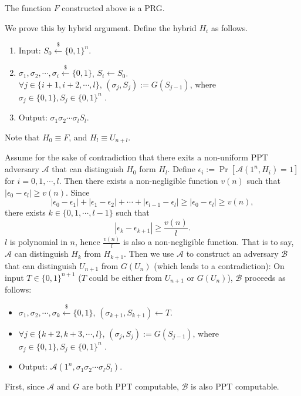 \documentclass[12pt]{tufte-book}
\newcommand{\ma}{\mathcal{A}}
\begin{document}
\begin{theorem}
The function $F$ constructed above is a PRG.
\end{theorem}

\proof
We prove this by hybrid argument. Define the hybrid $H_i$ as follows.
\begin{enumerate}[label=(\alph*)]
	\item Input: $S_0 \xleftarrow{\$} \{0, 1\}^n$.
    \item $\sigma_1, \sigma_2, \cdots, \sigma_i \xleftarrow{\$} \{0, 1\}$, $S_i \gets S_0$.\\
     $\forall j \in \{i+1, i+2, \cdots, l\}$, $(\sigma_j, S_j) := G(S_{j-1})$, where $\sigma_j \in \{0, 1\}, S_j \in \{0, 1\}^n$ .
    \item Output: $\sigma_1 \sigma_2 \cdots \sigma_l S_l$.
\end{enumerate}
Note that $H_0 \equiv F$, and $H_l \equiv U_{n+l}$.

Assume for the sake of contradiction that there exits a non-uniform PPT adversary $\ma$ that can distinguish $H_0$ form $H_l$.
Define $\epsilon_i := \Pr[\ma(1^n, H_i)=1]$ for $i = 0, 1, \cdots, l$.
Then there exists a non-negligible function $v(n)$ such that $|\epsilon_0 - \epsilon_l| \geq v(n)$.
Since
\[
|\epsilon_0 - \epsilon_1| +
|\epsilon_1 - \epsilon_2| +
\cdots +
|\epsilon_{l-1} - \epsilon_l| \geq
|\epsilon_0 - \epsilon_l|
\geq v(n),
\]
there exists $k \in \{0, 1, \cdots, l-1\}$ such that
\[
|\epsilon_{k} - \epsilon_{k+1}| \geq \frac{v(n)}{l}.
\]
$l$ is polynomial in $n$, hence $\frac{v(n)}{l}$ is also a non-negligible function.
That is to say, $\ma$ can distinguish $H_{k}$ from $H_{k+1}$.
Then we use $\ma$ to construct an adversary $\mathcal{B}$ that can distinguish $U_{n+1}$ from $G(U_n)$ (which leads to a contradiction):
On input $T \in \{0, 1\}^{n+1}$ ($T$ could be either from $U_{n+1}$ or $G(U_n)$), $\mathcal{B}$ proceeds as follows:
\begin{itemize}
\item $\sigma_1, \sigma_2, \cdots, \sigma_k \xleftarrow{\$} \{0, 1\}$, $(\sigma_{k+1}, S_{k+1}) \gets T$.
\item $\forall j \in \{k+2, k+3, \cdots, l\}$, $(\sigma_j, S_j) := G(S_{j-1})$, where $\sigma_j \in \{0, 1\}, S_j \in \{0, 1\}^n$ .
\item Output: $\ma(1^n, \sigma_1 \sigma_2 \cdots \sigma_l S_l)$.
\end{itemize}

First, since $\ma$ and $G$ are both PPT computable, $\mathcal{B}$ is also PPT computable.
\end{document}
